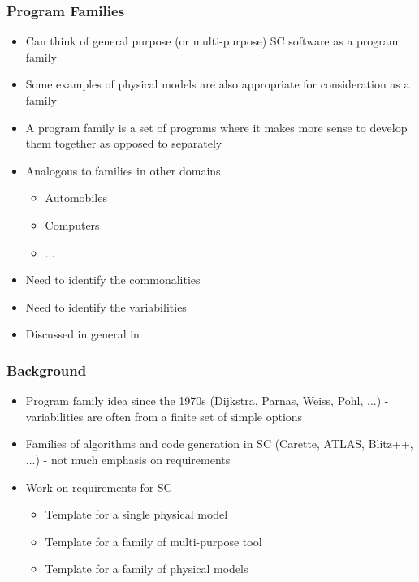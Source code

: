 \documentclass[t,12pt,numbers,fleqn]{beamer}
\begin{document}

\begin{frame}
\frametitle{Program Families}

\begin{itemize}

\item Can think of general purpose (or multi-purpose) SC software as a program
  family
\item Some examples of physical models are also appropriate for consideration as
  a family
\item A program family is a set of programs where it makes more sense to develop
  them together as opposed to separately
\item Analogous to families in other domains
\begin{itemize}
\item Automobiles
\item Computers
\item ...
\end{itemize}
\item Need to identify the commonalities
\item Need to identify the variabilities
\item Discussed in general in \cite{ClementsAndNorthrop2001,PohlEtAl2005}
\end{itemize}

\end{frame}


\begin{frame}
\frametitle{Background}

\begin{itemize}

\item Program family idea since the 1970s (Dijkstra, Parnas, Weiss, Pohl, ...) - variabilities are often from a finite
set of simple options \cite{Parnas1976, Parnas1979, Dijkstra1972}
\item Families of algorithms and code generation in SC (Carette, ATLAS, Blitz++, ...) - not much emphasis on
requirements \cite{Carette2006, WhaleyEtAl2001, Veldhuizen1998, Blitz2010}
\item Work on requirements for SC
\begin{itemize}
\item Template for a single physical model \cite{SmithEtAl2007, SmithAndLai2005}
\item Template for a family of multi-purpose tool \cite{Smith2006,
    SmithAndChen2004, SmithAndChen2004b}
\item Template for a family of physical models
  \cite{SmithMcCutchanAndCarette2017, SmithEtAl2008, McCutchan2007}
\end{itemize}
\end{itemize}

\end{frame}
\end{document}
